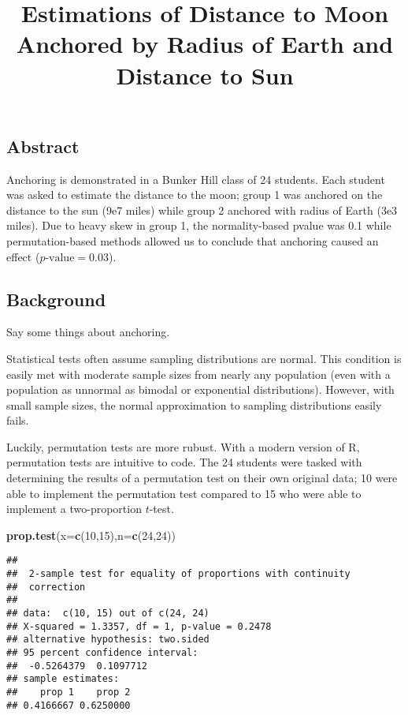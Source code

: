 \documentclass[]{article}
\title{Estimations of Distance to Moon Anchored by Radius of Earth and Distance
to Sun}
\author{}
\date{}
\newenvironment{Shaded}{\begin{snugshade}}{\end{snugshade}}
\newcommand{\DataTypeTok}[1]{\textcolor[rgb]{0.13,0.29,0.53}{#1}}
\newcommand{\DecValTok}[1]{\textcolor[rgb]{0.00,0.00,0.81}{#1}}
\newcommand{\KeywordTok}[1]{\textcolor[rgb]{0.13,0.29,0.53}{\textbf{#1}}}
\newcommand{\NormalTok}[1]{#1}
\begin{document}
\maketitle

\hypertarget{abstract}{%
\subsection{Abstract}\label{abstract}}

Anchoring is demonstrated in a Bunker Hill class of 24 students. Each
student was asked to estimate the distance to the moon; group 1 was
anchored on the distance to the sun (9e7 miles) while group 2 anchored
with radius of Earth (3e3 miles). Due to heavy skew in group 1, the
normality-based pvalue was 0.1 while permutation-based methods allowed
us to conclude that anchoring caused an effect
(\(p\text{-value} = 0.03\)).

\hypertarget{background}{%
\subsection{Background}\label{background}}

Say some things about anchoring.

Statistical tests often assume sampling distributions are normal. This
condition is easily met with moderate sample sizes from nearly any
population (even with a population as unnormal as bimodal or exponential
distributions). However, with small sample sizes, the normal
approximation to sampling distributions easily fails.

Luckily, permutation tests are more rubust. With a modern version of R,
permutation tests are intuitive to code. The 24 students were tasked
with determining the results of a permutation test on their own original
data; 10 were able to implement the permutation test compared to 15 who
were able to implement a two-proportion \(t\)-test.

\begin{Shaded}
\begin{Highlighting}[]
\KeywordTok{prop.test}\NormalTok{(}\DataTypeTok{x=}\KeywordTok{c}\NormalTok{(}\DecValTok{10}\NormalTok{,}\DecValTok{15}\NormalTok{),}\DataTypeTok{n=}\KeywordTok{c}\NormalTok{(}\DecValTok{24}\NormalTok{,}\DecValTok{24}\NormalTok{))}
\end{Highlighting}
\end{Shaded}

\begin{verbatim}
## 
##  2-sample test for equality of proportions with continuity
##  correction
## 
## data:  c(10, 15) out of c(24, 24)
## X-squared = 1.3357, df = 1, p-value = 0.2478
## alternative hypothesis: two.sided
## 95 percent confidence interval:
##  -0.5264379  0.1097712
## sample estimates:
##    prop 1    prop 2 
## 0.4166667 0.6250000
\end{verbatim}
\end{document}
